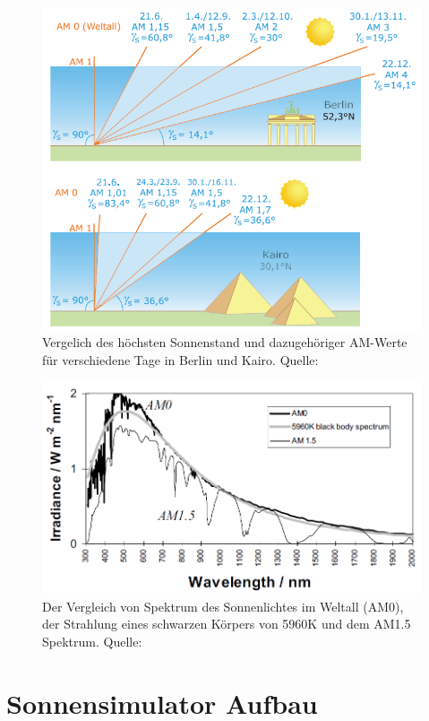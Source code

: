 \documentclass[a4paper,bibtotoc,oneside]{scrbook}
\begin{document}
\begin{figure}[htbp]
\centering
\includegraphics[width=125mm]{img/berlin.png}
\caption[Sonnenspektrum]{Vergelich des höchsten Sonnenstand und dazugehöriger AM-Werte für verschiedene Tage in Berlin und Kairo. Quelle: \cite{q01}}\label{airmass}
\end{figure}

\begin{figure}[htbp]
\centering
\includegraphics[width=125mm]{img/am.png}
\caption[Sonnenspektrum]{Der Vergleich von Spektrum des Sonnenlichtes im Weltall (AM0), der Strahlung eines schwarzen Körpers von 5960K und dem AM1.5 Spektrum. Quelle: \cite{n01}}\label{sunspec}
\end{figure}


\section{Sonnensimulator Aufbau}\thispagestyle{empty}
\end{document}
